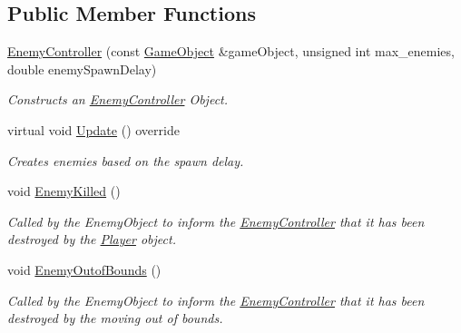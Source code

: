 \subsection*{Public Member Functions}
\begin{DoxyCompactItemize}
\item 
\hyperlink{class_enemy_controller_a07159de6348f511017c5415371459d50}{Enemy\+Controller} (const \hyperlink{class_game_object}{Game\+Object} \&game\+Object, unsigned int max\+\_\+enemies, double enemy\+Spawn\+Delay)
\begin{DoxyCompactList}\small\item\em Constructs an \hyperlink{class_enemy_controller}{Enemy\+Controller} Object. \end{DoxyCompactList}\item 
\mbox{\label{class_enemy_controller_af36ec67442d30c7519581b83ad6c00db}} 
virtual void \hyperlink{class_enemy_controller_af36ec67442d30c7519581b83ad6c00db}{Update} () override
\begin{DoxyCompactList}\small\item\em Creates enemies based on the spawn delay. \end{DoxyCompactList}\item 
\mbox{\label{class_enemy_controller_a011030dd51b78317ecb16356bf6591dc}} 
void \hyperlink{class_enemy_controller_a011030dd51b78317ecb16356bf6591dc}{Enemy\+Killed} ()
\begin{DoxyCompactList}\small\item\em Called by the Enemy\+Object to inform the \hyperlink{class_enemy_controller}{Enemy\+Controller} that it has been destroyed by the \hyperlink{class_player}{Player} object. \end{DoxyCompactList}\item 
void \hyperlink{class_enemy_controller_a182dba707716f8079bb6e67e8c5ed4ad}{Enemy\+Outof\+Bounds} ()
\begin{DoxyCompactList}\small\item\em Called by the Enemy\+Object to inform the \hyperlink{class_enemy_controller}{Enemy\+Controller} that it has been destroyed by the moving out of bounds. \end{DoxyCompactList}\end{DoxyCompactItemize}
